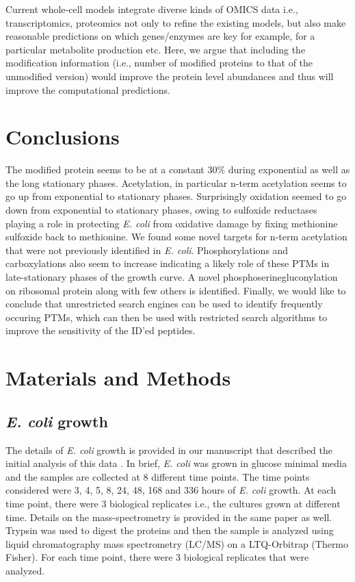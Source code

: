 \documentclass[12pt]{article}
\begin{document}
Current whole-cell models \cite{Covertetal2008} integrate diverse kinds of OMICS data i.e., transcriptomics, proteomics not only to refine the existing models, but also make reasonable predictions on which genes/enzymes are key for example, for a particular metabolite production etc. Here, we argue that including the modification information (i.e., number of modified proteins to that of the unmodified version) would improve the protein level abundances and thus will improve the computational predictions.

\section{Conclusions}

The modified protein seems to be at a constant 30\% during exponential as well as the long stationary phases. Acetylation, in particular n-term acetylation seems to go up from exponential to stationary phases. Surprisingly oxidation seemed to go down from exponential to stationary phases, owing to sulfoxide reductases playing a role in protecting \emph{E. coli} from oxidative damage by fixing methionine sulfoxide back to methionine. We found some novel targets for n-term acetylation that were not previously identified in \emph{E. coli}. Phosphorylations and carboxylations also seem to increase indicating a likely role of these PTMs in late-stationary phases of the growth curve. A novel phosphoserinegluconylation on ribosomal protein along with few others is identified. Finally, we would like to conclude that unrestricted search engines can be used to identify frequently occuring PTMs, which can then be used with restricted search algorithms to improve the sensitivity of the ID'ed peptides.


\section{Materials and Methods}

\subsection{\emph{E. coli} growth} 

The details of \emph{E. coli} growth is provided in our manuscript that described the initial analysis of this data \cite{Houseretal2015}. In brief, \emph{E. coli} was grown in glucose minimal media and the samples are collected at 8 different time points. The time points considered were 3, 4, 5, 8, 24, 48, 168 and 336 hours of \emph{E. coli} growth. At each time point, there were 3 biological replicates i.e., the cultures grown at different time. Details on the mass-spectrometry is provided in the same paper as well. Trypsin was used to digest the proteins and then the sample is analyzed using liquid chromatography mass spectrometry (LC/MS) on a LTQ-Orbitrap (Thermo Fisher). For each time point, there were 3 biological replicates that were analyzed.
\end{document}
